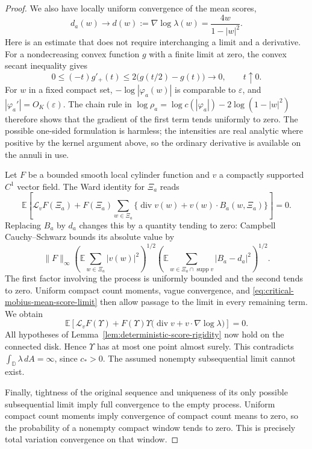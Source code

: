 \documentclass[11pt,a4paper]{article}
\numberwithin{equation}{section}
\theoremstyle{definition}
\theoremstyle{remark}
\begin{document}
\begin{proof}
We also have locally uniform convergence of the mean scores,
\begin{equation}
 d_a(w)\longrightarrow d(w):=\nabla\log\lambda(w)
                      =\frac{4w}{1-|w|^2}.
 \label{eq:critical-mobius-mean-score-limit}
\end{equation}
Here is an estimate that does not require interchanging a limit and a
derivative. For a nondecreasing convex function $g$ with a finite limit
at zero, the convex secant inequality gives
\[
 0\leq(-t)g'_+(t)
 \leq2\big(g(t/2)-g(t)\big)\longrightarrow0,
 \qquad t\uparrow0.
\]
For $w$ in a fixed compact set, $-\log|\varphi_a(w)|$ is comparable
to $\varepsilon$, and $|\varphi_a'|=O_K(\varepsilon)$.
The chain rule in
$\log\rho_a=\log c(|\varphi_a|)-2\log(1-|w|^2)$ therefore shows that
the gradient of the first term tends uniformly to zero. The possible
one-sided formulation is harmless; the intensities are real analytic
where positive by the kernel argument above, so the ordinary derivative
is available on the annuli in use.

Let $F$ be a bounded smooth local cylinder function and $v$ a compactly
supported $C^1$ vector field. The Ward identity for $\Xi_a$ reads
\[
 \mathbb E\left[\mathcal L_vF(\Xi_a)
  +F(\Xi_a)\sum_{w\in\Xi_a}
       \{\operatorname{div}v(w)+v(w)\cdot B_a(w,\Xi_a)\}\right]=0.
\]
Replacing $B_a$ by $d_a$ changes this by a quantity tending to zero:
Campbell Cauchy--Schwarz bounds its absolute value by
\[
 \|F\|_\infty
 \left(\mathbb E\sum_{w\in\Xi_a}|v(w)|^2\right)^{1/2}
 \left(\mathbb E\sum_{w\in\Xi_a\cap\operatorname{supp}v}
                         |B_a-d_a|^2\right)^{1/2}.
\]
The first factor involving the process is uniformly bounded and the
second tends to zero. Uniform compact count moments, vague convergence,
and \eqref{eq:critical-mobius-mean-score-limit} then allow passage to
the limit in every remaining term. We obtain
\[
 \mathbb E\left[\mathcal L_vF(\Upsilon)
  +F(\Upsilon)\Upsilon\bigl(\operatorname{div}v
                                  +v\cdot\nabla\log\lambda\bigr)\right]=0.
\]
All hypotheses of Lemma~\ref{lem:deterministic-score-rigidity} now hold
on the connected disk. Hence $\Upsilon$ has at most one point almost
surely. This contradicts
$\int_{\mathbb D}\lambda\,dA=\infty$, since $c_*>0$.
The assumed nonempty subsequential limit cannot exist.

Finally, tightness of the original sequence and uniqueness of its only
possible subsequential limit imply full convergence to the empty process.
Uniform compact count moments imply convergence of compact count means
to zero, so the probability of a nonempty compact window tends to zero.
This is precisely total variation convergence on that window.
\end{proof}
\end{document}
